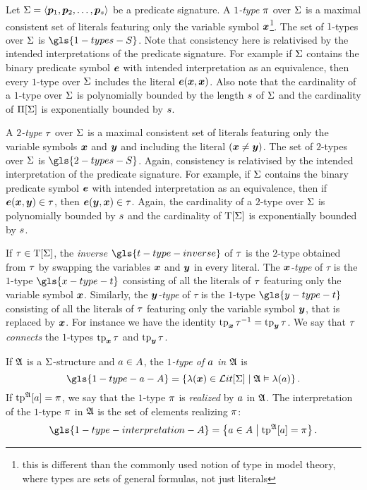 Let $\mathrm{\Sigma} = \left\langle \bm{p}_{1}, \bm{p}_{2}, \dots, \bm{p}_{s} \right\rangle$ be a predicate signature.
A \emph{$1$-type} $\pi$ over $\mathrm{\Sigma}$ is a maximal consistent set of literals
featuring only the variable symbol $\bm{x}$\footnote{this is different than the
commonly used notion of type in model theory, where types are sets of general
formulas, not just literals}.
The set of $1$-types over $\mathrm{\Sigma}$ is $\gls{1-types-S}$.
Note that consistency here is relativised by the intended interpretations of the
predicate signature. For example if $\mathrm{\Sigma}$ contains the binary predicate symbol
$\bm{e}$ with intended interpretation as an equivalence, then every $1$-type over
$\mathrm{\Sigma}$ includes the literal $\bm{e}(\bm{x},\bm{x})$.
Also note that the cardinality of a $1$-type over $\mathrm{\Sigma}$ is polynomially
bounded by the length $s$ of $\mathrm{\Sigma}$ and the cardinality of $\Pi[\mathrm{\Sigma}]$ is
exponentially bounded by $s$.

A \emph{$2$-type} $\tau$ over $\mathrm{\Sigma}$ is a maximal consistent set of literals
featuring only the variable symbols $\bm{x}$ and $\bm{y}$ and including the literal
$(\bm{x} \neq \bm{y})$.
The set of $2$-types over $\mathrm{\Sigma}$ is $\gls{2-types-S}$.
Again, consistency is relativised by the intended interpretation of the
predicate signature.
For example, if $\mathrm{\Sigma}$ contains the binary predicate
symbol $\bm{e}$ with intended interpretation as an equivalence,
then if $\bm{e}(\bm{x}, \bm{y}) \in \tau$, then $\bm{e}(\bm{y}, \bm{x}) \in \tau$.
Again, the cardinality of a $2$-type over $\mathrm{\Sigma}$ is polynomially bounded by
$s$ and the cardinality of $\mathrm{T}[\mathrm{\Sigma}]$ is exponentially bounded by
$s$.

If $\tau \in \mathrm{T}[\mathrm{\Sigma}]$, the \emph{inverse} $\gls{t-type-inverse}$ of $\tau$
is the $2$-type obtained from $\tau$ by
swapping the variables $\bm{x}$ and $\bm{y}$ in every literal.
The \emph{$\bm{x}$-type} of $\tau$ is the $1$-type $\gls{x-type-t}$
consisting of all the literals of $\tau$ featuring only the variable symbol
$\bm{x}$. Similarly, the \emph{$\bm{y}$-type} of $\tau$ is the $1$-type
$\gls{y-type-t}$ consisting of all the literals of $\tau$ featuring only the
variable symbol $\bm{y}$, that is replaced by $\bm{x}$.
For instance we have the identity $\operatorname{tp}_{\bm{x}}\tau^{-1} = \operatorname{tp}_{\bm{y}}\tau$.
We say that $\tau$ \emph{connects} the $1$-types $\operatorname{tp}_{\bm{x}}\tau$ and $\operatorname{tp}_{\bm{y}}\tau$.

If $\mathfrak{A}$ is a $\mathrm{\Sigma}$-structure and $a \in A$, the \emph{$1$-type of
$a$ in $\mathfrak{A}$} is
\[
  \gls{1-type-a-A} = \setbd{\litl(\xx) \in \LitF\SigS}{\StrA \vDash \litl(\ea)}.
\]
If $\operatorname{tp}^{\mathfrak{A}}[a] = \pi$, we say that the $1$-type $\pi$ is \emph{realized}
by $a$ in $\mathfrak{A}$. The interpretation of the $1$-type $\pi$ in $\mathfrak{A}$ is
the set of elements realizing $\pi$:
\[
  \gls{1-type-interpretation-A} = \setbd{\ea \in \domA}{\tpIa\StrA\ea = \tpIp}.
\]

